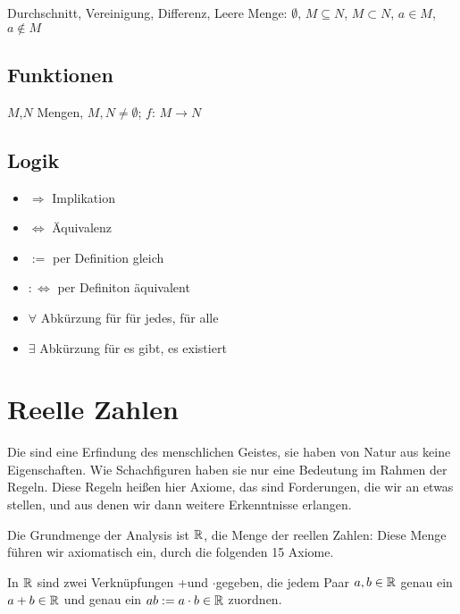 \documentclass[a4paper,twoside,DIV15,BCOR12mm]{scrbook}
\begin{document}
Durchschnitt, Vereinigung, Differenz, Leere Menge: $\emptyset$, $M\subseteq N$, $M\subset N$, $a \in M$, $a\notin M$

\section{Funktionen}

$M$,$N$ Mengen, $M,N \ne \emptyset$; $f:\, M\rightarrow N$

\section{Logik}

\begin{itemize}
\item $\Rightarrow$ Implikation
\item $\Leftrightarrow$ Äquivalenz
\item $:=$ per Definition gleich
\item $:\Leftrightarrow$ per Definiton äquivalent
\item $\forall$ Abkürzung für \glqq für jedes\grqq, \glqq für alle\grqq
\item $\exists$ Abkürzung für \glqq es gibt\grqq, \glqq es existiert\grqq
\end{itemize}



\renewcommand{\thechapter}{\arabic{chapter}}
\renewcommand{\chaptername}{§}
\setcounter{chapter}{0}

\chapter{Reelle Zahlen}

Die  sind eine Erfindung des menschlichen Geistes, sie haben von Natur aus keine Eigenschaften. Wie Schachfiguren haben sie nur eine Bedeutung im Rahmen der Regeln. Diese Regeln heißen hier Axiome, das sind Forderungen, die wir an etwas stellen, und aus denen wir dann weitere Erkenntnisse erlangen.

Die Grundmenge der Analysis ist $\mathbb{R}$, die Menge der reellen Zahlen: Diese Menge führen wir axiomatisch ein, durch die folgenden 15 Axiome.

In $\mathbb{R}$ sind zwei Verknüpfungen \glqq +\grqq und \glqq $\cdot$\grqq gegeben, die jedem Paar $a,b \in \mathbb{R}$ genau ein $ a+b \in \mathbb{R}$ und genau ein $ ab := a \cdot b \in \mathbb{R}$ zuordnen.
\end{document}
